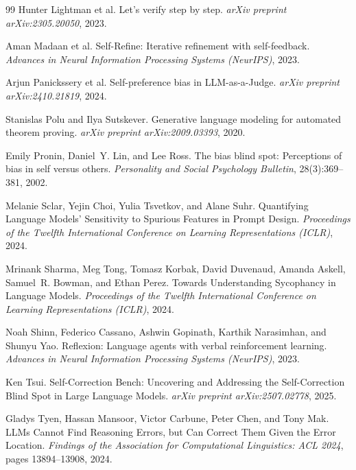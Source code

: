 \documentclass[11pt]{article}
\begin{document}
\begin{thebibliography}{99}
Hunter Lightman et al.
\newblock Let's verify step by step.
\newblock \emph{arXiv preprint arXiv:2305.20050}, 2023.

Aman Madaan et al.
\newblock Self-Refine: Iterative refinement with self-feedback.
\newblock \emph{Advances in Neural Information Processing Systems (NeurIPS)}, 2023.

Arjun Panickssery et al.
\newblock Self-preference bias in LLM-as-a-Judge.
\newblock \emph{arXiv preprint arXiv:2410.21819}, 2024.

Stanislas Polu and Ilya Sutskever.
\newblock Generative language modeling for automated theorem proving.
\newblock \emph{arXiv preprint arXiv:2009.03393}, 2020.

Emily Pronin, Daniel~Y. Lin, and Lee Ross.
\newblock The bias blind spot: Perceptions of bias in self versus others.
\newblock \emph{Personality and Social Psychology Bulletin}, 28(3):369--381, 2002.

Melanie Sclar, Yejin Choi, Yulia Tsvetkov, and Alane Suhr.
\newblock Quantifying Language Models' Sensitivity to Spurious Features in Prompt Design.
\newblock \emph{Proceedings of the Twelfth International Conference on Learning Representations (ICLR)}, 2024.

Mrinank Sharma, Meg Tong, Tomasz Korbak, David Duvenaud, Amanda Askell, Samuel~R. Bowman, and Ethan Perez.
\newblock Towards Understanding Sycophancy in Language Models.
\newblock \emph{Proceedings of the Twelfth International Conference on Learning Representations (ICLR)}, 2024.

Noah Shinn, Federico Cassano, Ashwin Gopinath, Karthik Narasimhan, and Shunyu Yao.
\newblock Reflexion: Language agents with verbal reinforcement learning.
\newblock \emph{Advances in Neural Information Processing Systems (NeurIPS)}, 2023.

Ken Tsui.
\newblock Self-Correction Bench: Uncovering and Addressing the Self-Correction Blind Spot in Large Language Models.
\newblock \emph{arXiv preprint arXiv:2507.02778}, 2025.

Gladys Tyen, Hassan Mansoor, Victor Carbune, Peter Chen, and Tony Mak.
\newblock LLMs Cannot Find Reasoning Errors, but Can Correct Them Given the Error Location.
\newblock \emph{Findings of the Association for Computational Linguistics: ACL 2024}, pages 13894--13908, 2024.


\end{thebibliography}
\end{document}
